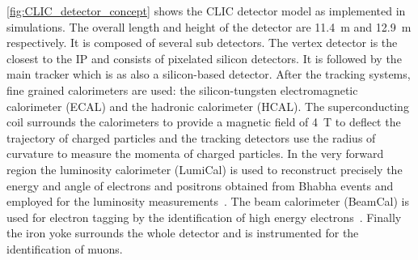 \cref{fig:CLIC_detector_concept} shows the CLIC detector model as
implemented in simulations. The overall length and height of the
detector are 11.4~m and 12.9~m respectively. It is composed of several
sub detectors. The vertex detector is the closest to the IP and
consists of pixelated silicon detectors. It is followed by the main
tracker which is as also a silicon-based detector. After the tracking
systems, fine grained calorimeters are used: the silicon-tungsten
electromagnetic calorimeter (ECAL) and the hadronic calorimeter
(HCAL). The superconducting coil surrounds the calorimeters to provide
a magnetic field of 4~T to deflect the trajectory of charged particles
and the tracking detectors use the radius of curvature to measure the
momenta of charged particles. In the very forward region the
luminosity calorimeter (LumiCal) is used to reconstruct precisely the
energy and angle of electrons and positrons obtained from Bhabha
events and employed for the luminosity
measurements~\cite{Abramowicz:2010bg}. The beam calorimeter (BeamCal)
is used for electron tagging by the identification of high energy
electrons~\cite{Abramowicz:2004me}. Finally the iron yoke surrounds
the whole detector and is instrumented for the identification of
muons.


